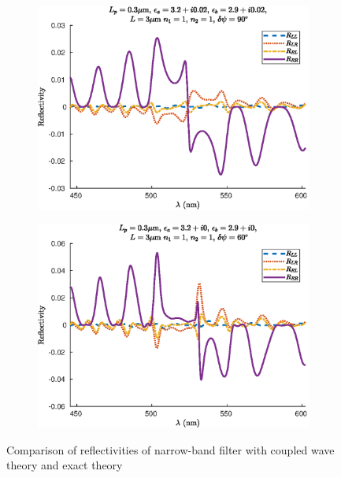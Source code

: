 \begin{figure}
\begin{subfigure}{0.49\linewidth}
		\includegraphics[width=\linewidth]{plots/defect/reflectivity_losses/comparison_reflection}
		\caption{}
	\end{subfigure}
	\begin{subfigure}{0.49\linewidth}
		\includegraphics[width=\linewidth]{plots/defect/reflectivity_other_defect/comparison_reflection}
		\caption{}
	\end{subfigure}
	\caption[Comparison of reflectivity of the narrow-band filter]{Comparison of reflectivities of narrow-band filter with coupled wave theory and exact theory}
	\label{fig:reflectivities_narrow_appendix_comp}
\end{figure}